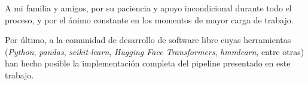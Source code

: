 \vspace{0.5cm}

\noindent
A mi familia y amigos, por su paciencia y apoyo incondicional durante todo
el proceso, y por el ánimo constante en los momentos de mayor carga de
trabajo.

\vspace{0.5cm}

\noindent
Por último, a la comunidad de desarrollo de software libre cuyas
herramientas (\textit{Python}, \textit{pandas}, \textit{scikit-learn},
\textit{Hugging Face Transformers}, \textit{hmmlearn}, entre otras) han
hecho posible la implementación completa del pipeline presentado en este
trabajo.

\clearpage
